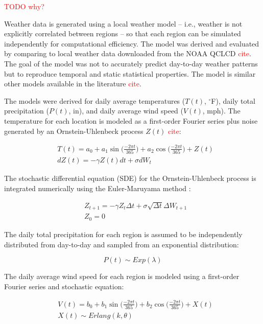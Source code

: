 \documentclass[conference]{IEEEtran}
\begin{document}
\textcolor{red}{TODO why?}

Weather data is generated using a local weather model -- i.e., weather is not explicitly correlated between regions -- so that each region can be simulated independently for computational efficiency.  The model was derived and evaluated by comparing to local weather data downloaded from the NOAA QCLCD \textcolor{red}{cite}.  The goal of the model was not to accurately predict day-to-day weather patterns but to reproduce temporal and static statistical properties.  The model is similar other models available in the literature \textcolor{red}{cite}.

The models were derived for daily average temperatures ($T(t)$, $^\circ$F), daily total precipitation ($P(t)$, in), and daily average wind speed ($V(t)$, mph). The temperature for each location is modeled as a first-order Fourier series plus noise generated by an Ornstein-Uhlenbeck process $Z(t)$ \textcolor{red}{cite}:

\begin{align}
&T(t) = a_0 + a_1\sin\Big(\frac{-2 \pi t}{365}\Big) + a_2\cos\Big(\frac{-2 \pi t}{365}\Big) + Z(t) \\
&dZ(t) = - \gamma Z(t) dt + \sigma dW_t
\end{align}

The stochastic differential equation (SDE) for the Ornstein-Uhlenbeck process is integrated numerically using the Euler-Maruyama method \cite{Klouden13}:

\begin{align}
&Z_{t+1} = -\gamma Z_t \Delta t + \sigma \sqrt{\Delta t} \Delta W_{t+1} \\
&Z_0 = 0 \nonumber
\end{align}

The daily total precipitation for each region is assumed to be independently distributed from day-to-day and sampled from an exponential distribution:

\begin{equation}
P(t) \sim Exp(\lambda)
\end{equation}

The daily average wind speed for each region is modeled using a first-order Fourier series and stochastic equation:

\begin{align}
&V(t) = b_0 + b_1\sin\Big(\frac{-2 \pi t}{365}\Big) + b_2\cos\Big(\frac{-2 \pi t}{365}\Big) + X(t) \\
&X(t) \sim Erlang(k, \theta)
\end{align}
\end{document}
